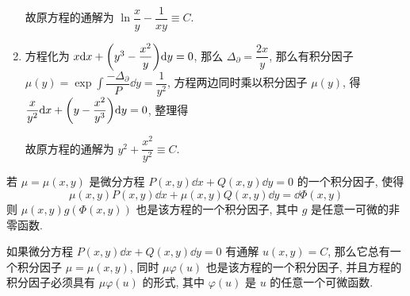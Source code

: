 \begin{solution}
\begin{enumerate}[label=(\arabic{*})]
              故原方程的通解为 $\ln\dfrac{x}{y}-\dfrac{1}{xy}\equiv C.$
        \item 方程化为 $x\dd x+\qty(y^3-\dfrac{x^2}{y})\dd y=0$, 那么 $\Delta_\partial=\dfrac{2x}{y}$, 那么有积分因子 $\mu(y)=\exp\displaystyle\int\dfrac{-\Delta_\partial}{P}\dd y=\dfrac{1}{y^2}$,
              方程两边同时乘以积分因子 $\mu(y)$, 得 $\dfrac{x}{y^2}\dd x+\qty(y-\dfrac{x^2}{y^3})\dd y=0$, 整理得
              故原方程的通解为 $y^2+\dfrac{x^2}{y^2}\equiv C.$
    \end{enumerate}
\end{solution}

\begin{theorem}
    若 $\mu=\mu(x,y)$ 是微分方程 $P(x,y)\dd x+Q(x,y)\dd y=0$ 的一个积分因子, 使得
    $$\mu(x,y)P(x,y)\dd x+\mu(x,y)Q(x,y)\dd y=\dd \Phi(x,y)$$
    则 $\mu(x,y)g(\Phi(x,y))$ 也是该方程的一个积分因子, 其中 $g$ 是任意一可微的非零函数.
\end{theorem}
\begin{theorem}[积分因子的存在性定理]
    如果微分方程 $P(x,y)\dd x+Q(x,y)\dd y=0$ 有通解 $u(x,y)=C$, 那么它总有一个积分因子 $\mu=\mu(x,y)$, 同时 $\mu\varphi(u)$ 也是该方程的一个积分因子, 并且方程的积分因子必须具有 $\mu\varphi(u)$ 的形式, 其中 $\varphi(u)$ 是 $u$ 的任意一个可微函数.
\end{theorem}

